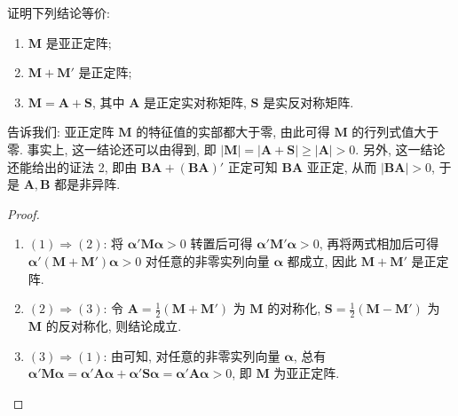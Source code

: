 \documentclass[../../main.tex]{subfiles}%
\begin{document}
\begin{theorem}\label{theorem:亚正定阵的等价条件}
证明下列结论等价:
\begin{enumerate}[(1)]
\item \(\boldsymbol{M}\) 是亚正定阵;
\item \(\boldsymbol{M}+\boldsymbol{M}'\) 是正定阵;
\item \(\boldsymbol{M}=\boldsymbol{A}+\boldsymbol{S}\), 其中 \(\boldsymbol{A}\) 是正定实对称矩阵, \(\boldsymbol{S}\) 是实反对称矩阵.
\end{enumerate}
\end{theorem}
\begin{remark}
告诉我们: 亚正定阵 \(\boldsymbol{M}\) 的特征值的实部都大于零, 由此可得 \(\boldsymbol{M}\) 的行列式值大于零. 事实上, 这一结论还可以由得到, 即 \(|\boldsymbol{M}|=|\boldsymbol{A}+\boldsymbol{S}|\geqslant |\boldsymbol{A}|>0\). 另外, 这一结论还能给出的证法 2, 即由 \(\boldsymbol{B}\boldsymbol{A}+(\boldsymbol{B}\boldsymbol{A})'\) 正定可知 \(\boldsymbol{B}\boldsymbol{A}\) 亚正定, 从而 \(|\boldsymbol{B}\boldsymbol{A}|>0\), 于是 \(\boldsymbol{A},\boldsymbol{B}\) 都是非异阵. 
\end{remark}
\begin{proof}
\begin{enumerate}
\item \((1)\Rightarrow(2)\): 将 \(\boldsymbol{\alpha}'\boldsymbol{M}\boldsymbol{\alpha}>0\) 转置后可得 \(\boldsymbol{\alpha}'\boldsymbol{M}'\boldsymbol{\alpha}>0\), 再将两式相加后可得 \(\boldsymbol{\alpha}'(\boldsymbol{M}+\boldsymbol{M}')\boldsymbol{\alpha}>0\) 对任意的非零实列向量 \(\boldsymbol{\alpha}\) 都成立, 因此 \(\boldsymbol{M}+\boldsymbol{M}'\) 是正定阵.
\item \((2)\Rightarrow(3)\): 令 \(\boldsymbol{A}=\frac{1}{2}(\boldsymbol{M}+\boldsymbol{M}')\) 为 \(\boldsymbol{M}\) 的对称化, \(\boldsymbol{S}=\frac{1}{2}(\boldsymbol{M}-\boldsymbol{M}')\) 为 \(\boldsymbol{M}\) 的反对称化, 则结论成立.
\item \((3)\Rightarrow(1)\): 由可知, 对任意的非零实列向量 \(\boldsymbol{\alpha}\), 总有 \(\boldsymbol{\alpha}'\boldsymbol{M}\boldsymbol{\alpha}=\boldsymbol{\alpha}'\boldsymbol{A}\boldsymbol{\alpha}+\boldsymbol{\alpha}'\boldsymbol{S}\boldsymbol{\alpha}=\boldsymbol{\alpha}'\boldsymbol{A}\boldsymbol{\alpha}>0\), 即 \(\boldsymbol{M}\) 为亚正定阵. 
\end{enumerate}

\end{proof}
\end{document}
